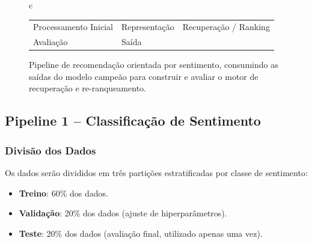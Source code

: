 \documentclass{IEEEtran}
\begin{document}
\begin{figure}[htbp]
\begin{tabular}{c}
    \begin{tabular}{lll}
      \fcolorbox{black}{colorIngestao}{\rule{0pt}{4pt}\rule{4pt}{0pt}} \footnotesize Processamento Inicial &
      \fcolorbox{black}{colorRepres}{\rule{0pt}{4pt}\rule{4pt}{0pt}} \footnotesize Representação &
      \fcolorbox{black}{colorClassif}{\rule{0pt}{4pt}\rule{4pt}{0pt}} \footnotesize Recuperação / Ranking \\
      \fcolorbox{black}{colorAvaliacao}{\rule{0pt}{4pt}\rule{4pt}{0pt}} \footnotesize Avaliação &
      \fcolorbox{black}{colorSaida}{\rule{0pt}{4pt}\rule{4pt}{0pt}} \footnotesize Saída &
    \end{tabular}

  \end{tabular}
  \caption{Pipeline de recomendação orientada por sentimento, consumindo as saídas do modelo campeão para construir e avaliar o motor de recuperação e re-ranqueamento.}
  \label{fig:pipeline_recommendation}
\end{figure}



\subsection{Pipeline 1 -- Classificação de Sentimento}
\label{subsec:pipeline1}

\subsubsection{Divisão dos Dados}
\label{subsubsec:split}

Os dados serão divididos em três partições estratificadas por classe de sentimento:

\begin{itemize}[noitemsep]
  \item \textbf{Treino}: 60\% dos dados.
  \item \textbf{Validação}: 20\% dos dados (ajuste de hiperparâmetros).
  \item \textbf{Teste}: 20\% dos dados (avaliação final, utilizado apenas uma vez).
\end{itemize}
\end{document}
